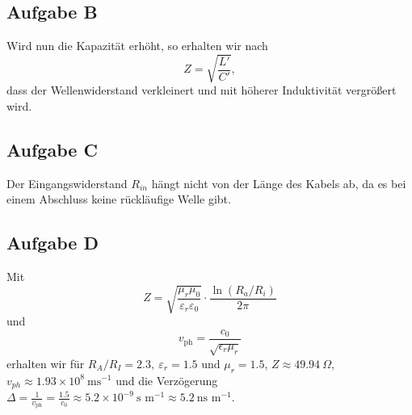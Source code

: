 \documentclass[10pt]{article}
\begin{document}
\begin{multicols}{2}
	\subsection{Aufgabe B}
	Wird nun die Kapazität erhöht, so erhalten wir nach
	\[
		Z =\sqrt{\frac{L'}{C'}},
	\]
  dass der Wellenwiderstand verkleinert und mit höherer Induktivität vergrößert wird.
	\subsection{Aufgabe C}
  Der Eingangswiderstand $R_{in}$ hängt nicht von der Länge des Kabels ab, da es bei einem Abschluss keine rückläufige Welle gibt.
	\subsection{Aufgabe D}
  Mit
  \[
  Z=\sqrt{\frac{\mu_r \mu_0}{\varepsilon_r \varepsilon_0}} \cdot \frac{\ln\left(R_a/R_i\right)}{2\pi}
  \]
  und
  \[
    v_{\text{ph}}=\frac{c_0}{\sqrt{\epsilon_r\mu_r}}
  \]
  erhalten wir für $R_A/R_I = 2.3, \ \varepsilon_r = 1.5 $ und $\mu_r = 1.5$, $Z\approx 49.94 \ \Omega$, $v_{ph}\approx 1.93 \times 10^{8} \ \text{ms}^{-1}$ und die Verzögerung $\Delta = \frac{1}{v_{\text{ph}}} = \frac{1.5}{c_0} \approx 5.2 \times 10^{-9} \ \text{s m}^{-1} \approx 5.2 \ \text{ns m}^{-1}$.



\end{multicols}
\end{document}
